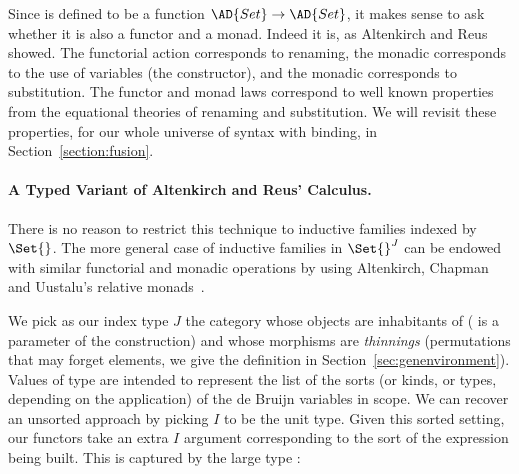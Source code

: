 Since  is defined to be a function $\AD{Set} \to \AD{Set}$, it
makes sense to ask whether it is also a functor and a monad. Indeed it
is, as Altenkirch and Reus showed. The functorial action corresponds
to renaming, the monadic  corresponds to the use of variables
(the  constructor), and the monadic  corresponds
to substitution. The functor and monad laws correspond to well known
properties from the equational theories of renaming and
substitution. We will revisit these properties, for our whole universe
of syntax with binding, in Section~\ref{section:fusion}.

\paragraph*{A Typed Variant of Altenkirch and Reus' Calculus.}
\label{section:mech-reus}

There is no reason to restrict this technique to inductive families
indexed by $\Set{}$. The more general case of inductive families in
$\Set{}^J$ can be endowed with similar functorial and monadic
operations by using Altenkirch, Chapman and Uustalu's relative
monads~\citeyear{Altenkirch2010, JFR4389}.

We pick as our index type $J$ the category whose objects are
inhabitants of   ( is a parameter of the
construction) and whose morphisms are \emph{thinnings} (permutations that may
forget elements, we give the definition in Section~\ref{sec:genenvironment}).  Values of type
  are intended to represent the list of the sorts (or
kinds, or types, depending on the application) of the de Bruijn
variables in scope. We can recover an unsorted approach by picking $I$
to be the unit type.  Given this sorted setting, our functors take an
extra $I$ argument corresponding to the sort of the expression being
built. This is captured by the large type 
:%

